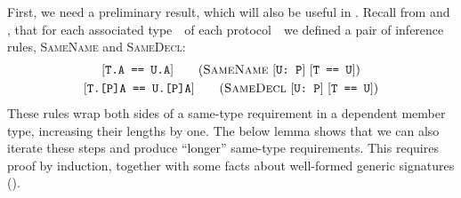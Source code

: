 \documentclass[../generics]{subfiles}
\begin{document}
First, we need a preliminary result, which will also be useful in . Recall from  and , that for each associated type~\nA\ of each protocol~\tP\ we defined a pair of inference rules, \textsc{SameName} and \textsc{SameDecl}:
\begin{gather*}
\SameNameStepDef\\
\SameDeclStepDef
\end{gather*}
These rules wrap both sides of a same-type requirement in a dependent member type, increasing their lengths by one. The below lemma shows that we can also iterate these steps and produce ``longer'' same-type requirements. This requires proof by induction, together with some facts about well-formed generic signatures ().
\end{document}
